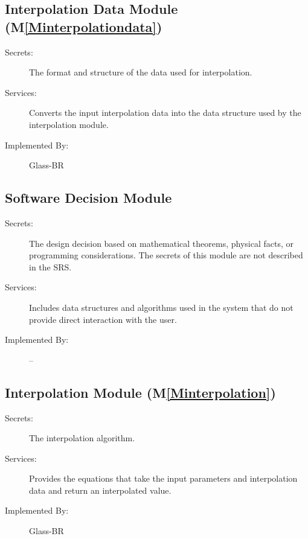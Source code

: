 \documentclass[12pt]{article}
\begin{document}
\subsection{Interpolation Data Module (M\ref{Minterpolationdata})}
\label{Sec:IDM()}
\begin{description}
\item[Secrets:]The format and structure of the data used for interpolation.
\item[Services:]Converts the input interpolation data into the data structure used by the interpolation module.
\item[Implemented By:]Glass-BR
\end{description}
\subsection{Software Decision Module}
\label{Sec:SDM}
\begin{description}
\item[Secrets:]The design decision based on mathematical theorems, physical facts, or programming considerations. The secrets of this module are not described in the SRS.
\item[Services:]Includes data structures and algorithms used in the system that do not provide direct interaction with the user.
\item[Implemented By:]--
\end{description}
\subsection{Interpolation Module (M\ref{Minterpolation})}
\label{Sec:IM()}
\begin{description}
\item[Secrets:]The interpolation algorithm.
\item[Services:]Provides the equations that take the input parameters and interpolation data and return an interpolated value.
\item[Implemented By:]Glass-BR
\end{description}
\end{document}
